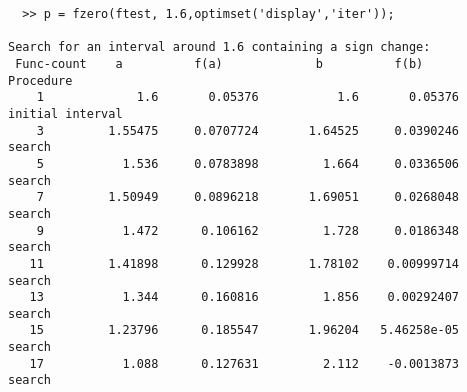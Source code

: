 \documentclass{article}
\begin{document}
\begin{verbatim}
  >> p = fzero(ftest, 1.6,optimset('display','iter'));
 
Search for an interval around 1.6 containing a sign change:
 Func-count    a          f(a)             b          f(b)        Procedure
    1             1.6       0.05376           1.6       0.05376   initial interval
    3         1.55475     0.0707724       1.64525     0.0390246   search
    5           1.536     0.0783898         1.664     0.0336506   search
    7         1.50949     0.0896218       1.69051     0.0268048   search
    9           1.472      0.106162         1.728     0.0186348   search
   11         1.41898      0.129928       1.78102    0.00999714   search
   13           1.344      0.160816         1.856    0.00292407   search
   15         1.23796      0.185547       1.96204   5.46258e-05   search
   17           1.088      0.127631         2.112    -0.0013873   search
 

\end{verbatim}
\end{document}
